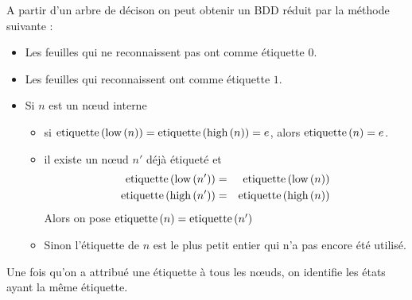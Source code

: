 A partir d'un arbre de décison on peut obtenir un BDD réduit par la méthode suivante :
\begin{itemize}
	\item Les feuilles qui ne reconnaissent pas ont comme étiquette $0$.
	\item Les feuilles qui reconnaissent ont comme étiquette $1$.
	\item Si $n$ est un nœud interne
	      \begin{itemize}
		      \item si $\text{etiquette}\left(\text{low}\left(n\right)\right) = \text{etiquette}\left(\text{high}\left(n\right)\right) = e$, alors $\text{etiquette}\left(n\right) = e$.
		      \item il existe un nœud $n'$ déjà étiqueté et \tq
		            \begin{eqnarray*}
			            \text{etiquette}\left(\text{low}\left(n'\right)\right) &=& \text{etiquette}\left(\text{low}\left(n\right)\right) \\
			            \text{etiquette}\left(\text{high}\left(n'\right)\right) &=& \text{etiquette}\left(\text{high}\left(n\right)\right)
		            \end{eqnarray*}
		            Alors on pose $\text{etiquette}\left(n\right) = \text{etiquette}\left(n'\right)$
		      \item Sinon l'étiquette de $n$ est le plus petit entier qui n'a pas encore été utilisé.
	      \end{itemize}
\end{itemize}

Une fois qu'on a attribué une étiquette à tous les nœuds, on identifie les états ayant la même étiquette.



